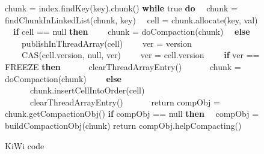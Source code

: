 \begin{figure}
	\begin{center}
		\begin{algorithmic}[1]{}
		\State chunk = index.findKey(key).chunk()
		\State \textbf{while} true \textbf{do}
		\State \ \ chunk = findChunkInLinkedList(chunk, key)
		\State \ \ cell = chunk.allocate(key, val)
		\State \ \ \textbf{if} cell == null \textbf{then} 
		\State \ \ \ \ chunk = doCompaction(chunk)
		\State \ \ \textbf{else}
		\State \ \ \ \ publishInThreadArray(cell) 
		\State \ \ \ \ ver = version 
		\State \ \ \ \ CAS(cell.version, null, ver) 
		\State \ \ \ \ ver = cell.version 
		\State \ \ \ \ \textbf{if} ver == FREEZE \textbf{then} 
		\State \ \ \ \ \ \ clearThreadArrayEntry() 
		\State \ \ \ \ \ \ chunk = doCompaction(chunk)
		\State \ \ \ \ \textbf{else} 
		\State \ \ \ \ \ \ chunk.insertCellIntoOrder(cell) 
		\State \ \ \ \ \ \ clearThreadArrayEntry() 
		\State \ \ \ \ \ \ return
		\EndFunction
		\Statex 
		\State compObj = chunk.getCompactionObj()
		\State \textbf{if} compObj == null \textbf{then}
		\State \ \ compObj = buildCompactionObj(chunk)
		\State return compObj.helpCompacting()
		\EndFunction
		\end{algorithmic}
		\caption{KiWi code} \label{figure:kiwi}
	\end{center}
\end{figure}

